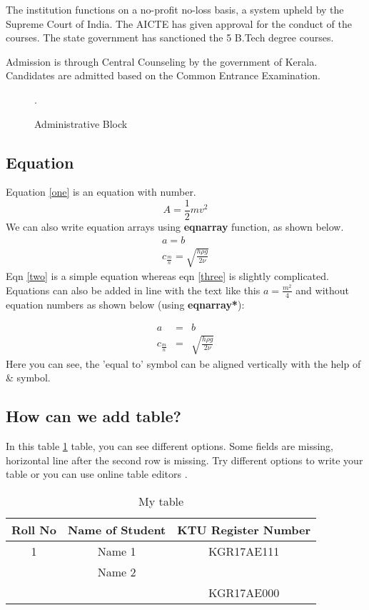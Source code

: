 \documentclass[12pt,a4paper]{report}
\begin{document}
The institution functions on a no-profit no-loss basis, a system upheld by the Supreme Court of India. The AICTE has given approval for the conduct of the courses. The state government has sanctioned the 5 B.Tech degree courses.

Admission is through Central Counseling by the government of Kerala. Candidates are admitted based on the Common Entrance Examination\cite{ref1}.


\begin{figure}[ht]
\centering
\caption{Administrative Block}.
\label{mainblock}
\end{figure}

\subsection{Equation}
Equation  \ref{one} is an equation with number.
\begin{equation}
A = \frac{1}{2} m v^{2}
\label{one}
\end{equation}
We can also write equation arrays using \textbf{eqnarray} function, as shown below.
\begin{eqnarray}
a = b \label{two}\\
c_{\frac{m}{n}} = \sqrt{\frac{h \rho g}{2 \nu}} \label{three}
\end{eqnarray}
Eqn \ref{two} is a simple equation whereas eqn \ref{three} is slightly complicated.
Equations can also be added in line with the text like this $a = \frac{m^2}{4}$ and without equation numbers as shown below (using \textbf{eqnarray*}):

\begin{eqnarray*}
a &=& b\\
c_{\frac{m}{n}} &=& \sqrt{\frac{h \rho g}{2 \nu}} 
\end{eqnarray*}
Here you can see, the 'equal to' symbol can be aligned vertically with the help of \& symbol.

\subsection{How can we add table?}
In this table \ref{table1} table, you can see different options. Some fields are missing, horizontal line after the second row is missing. Try different options to write your table or you can use online table editors \cite{ref2}.


\begin{table}[h]
\begin{center}
    
\begin{tabular}{|c|c|c|}
\hline
    Roll No & Name of Student & KTU Register Number \\
    \hline
    1& Name 1&KGR17AE111 \\
    \hline
    &Name 2 & \\
    & & KGR17AE000\\
    \hline
\end{tabular}
\caption{My table}
\label{table1}
\end{center}
\end{table}
\end{document}
